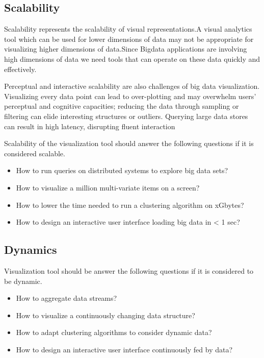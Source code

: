 \subsection{Scalability}
Scalability represents the scalability of visual representations.A visual analytics tool which can be used for lower dimensions of data may not be appropriate for visualizing higher dimensions of data.Since Bigdata applications are involving high dimensions of data we need tools that can operate on these data quickly and effectively.
\par 
Perceptual and interactive scalability are also challenges of big data visualization. Visualizing every data point can lead to over-plotting and may overwhelm users’ perceptual and cognitive capacities; reducing the data through sampling or filtering can elide interesting structures or outliers. Querying large data stores can result in high latency, disrupting fluent interaction
\par 
Scalability of the visualization tool should answer the following questions if it is considered scalable.
\begin{itemize}
	\item How to run queries on distributed systems to explore big data sets?
	\item How to visualize a million multi-variate items on a screen?
	\item How to lower the time needed to run a clustering algorithm on xGbytes?
	\item How to design an interactive user interface loading big data in < 1 sec?
\end{itemize}
\subsection{Dynamics}
Visualization tool should be answer the following questions if it is considered to be dynamic.
\begin{itemize}
	\item How to aggregate data streams?
	\item How to visualize a continuously changing data structure?
	\item How to adapt clustering algorithms to consider dynamic data?
	\item How to design an interactive user interface continuously fed by data?
\end{itemize}
